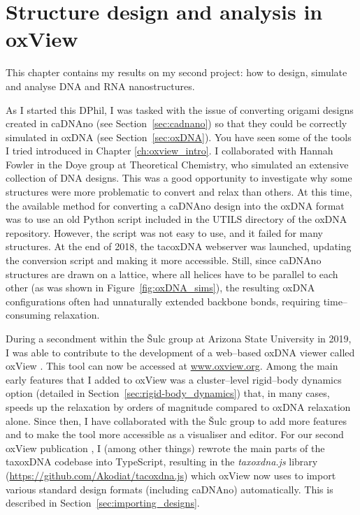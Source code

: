 \chapter{\label{ch:oxview}Structure design and analysis in oxView}

\minitoc


This chapter contains my results on my second project: how to design, simulate and analyse DNA and RNA nanostructures.

As I started this DPhil, I was tasked with the issue of converting origami designs created in caDNAno (see Section~\ref{sec:cadnano}) so that they could be correctly simulated in oxDNA (see Section~\ref{sec:oxDNA}). You have seen some of the tools I tried introduced in Chapter \ref{ch:oxview_intro}. I collaborated with Hannah Fowler in the Doye group at Theoretical Chemistry, who simulated an extensive collection of DNA designs. This was a good opportunity to investigate why some structures were more problematic to convert and relax than others. At this time, the available method for converting a caDNAno design into the oxDNA format was to use an old Python script included in the UTILS directory of the oxDNA repository. However, the script was not easy to use, and it failed for many structures. At the end of 2018, the tacoxDNA webserver \cite{suma2019tacoxdna} was launched, updating the conversion script and making it more accessible. Still, since caDNAno structures are drawn on a lattice, where all helices have to be parallel to each other (as was shown in Figure~\ref{fig:oxDNA_sims}), the resulting oxDNA configurations often had unnaturally extended backbone bonds, requiring time--consuming relaxation.

During a secondment within the {\v{S}}ulc group at Arizona State University in 2019, I was able to contribute to the development of a web--based oxDNA viewer called oxView \cite{poppleton2020design, bohlin2022oxview}. This tool can now be accessed at {\large\url{www.oxview.org}}. Among the main early features that I added to oxView was a cluster--level rigid--body dynamics option (detailed in Section~\ref{sec:rigid-body_dynamics}) that, in many cases, speeds up the relaxation by orders of magnitude compared to oxDNA relaxation alone. Since then, I have collaborated with the {\v{S}}ulc group to add more features and to make the tool more accessible as a visualiser and editor. For our second oxView publication \cite{bohlin2022oxview}, I (among other things) rewrote the main parts of the taxoxDNA codebase into TypeScript, resulting in the \emph{taxoxdna.js} library (\url{https://github.com/Akodiat/tacoxdna.js}) which oxView now uses to import various standard design formats (including caDNAno) automatically. This is described in Section~\ref{sec:importing_designs}.

